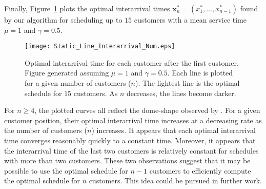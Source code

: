 Finally, Figure~\ref{fig:Static_Time_Num} plots the optimal interarrival times $\mathbf{x}_{n}^{*} = (x_{1}^{*}, \ldots, x_{n - 1}^{*})$ found by our algorithm for scheduling up to $15$ customers with a mean service time $\mu = 1$ and $\gamma = 0.5$.
\begin{figure}[htb]
	\centering
	\texttt{[image: Static\_Line\_Interarrival\_Num.eps]}
	\caption{Optimal interarrival time for each customer after the first customer. Figure generated assuming $\mu = 1$ and $\gamma = 0.5$. Each line is plotted for a given number of customers ($n$). The lightest line is the optimal schedule for $15$ customers. As $n$ decreases, the lines become darker.}
	\label{fig:Static_Time_Num}
\end{figure}

For $n \geq 4$, the plotted curves all reflect the dome-shape observed by \citet{Stein}. For a given customer position, their optimal interarrival time increases at a decreasing rate as the number of customers ($n$) increases. It appears that each optimal interarrival time converges reasonably quickly to a constant time. Moreover, it appears that the interarrival time of the last two customers is relatively constant for schedules with more than two customers. These two observations suggest that it may be possible to use the optimal schedule for $n - 1$ customers to efficiently compute the optimal schedule for $n$ customers. This idea could be pursued in further work.








































